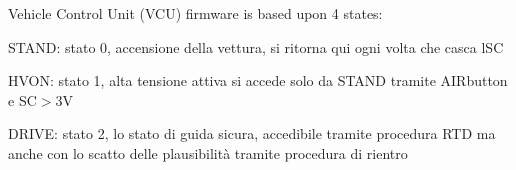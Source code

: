 Vehicle Control Unit (V\+CU) firmware is based upon 4 states\+:
\begin{DoxyItemize}
\item S\+T\+A\+ND\+: stato 0, accensione della vettura, si ritorna qui ogni volta che casca l\textquotesingle{}SC
\item H\+V\+ON\+: stato 1, alta tensione attiva si accede solo da S\+T\+A\+ND tramite A\+I\+Rbutton e SC$>$3V
\item D\+R\+I\+VE\+: stato 2, lo stato di guida sicura, accedibile tramite procedura R\+TD ma anche con lo scatto delle plausibilità tramite procedura di rientro 
\end{DoxyItemize}